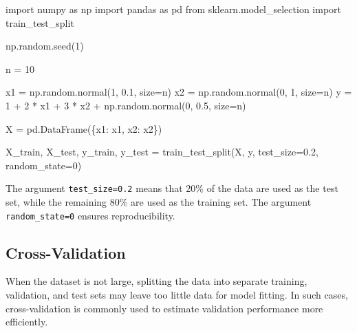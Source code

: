 \documentclass[
  letterpaper,
  DIV=11,
  numbers=noendperiod]{scrreprt}
\newenvironment{Shaded}{\begin{snugshade}}{\end{snugshade}}
\newcommand{\DecValTok}[1]{\textcolor[rgb]{0.68,0.00,0.00}{#1}}
\newcommand{\FloatTok}[1]{\textcolor[rgb]{0.68,0.00,0.00}{#1}}
\newcommand{\ImportTok}[1]{\textcolor[rgb]{0.00,0.46,0.62}{#1}}
\newcommand{\NormalTok}[1]{\textcolor[rgb]{0.00,0.23,0.31}{#1}}
\newcommand{\OperatorTok}[1]{\textcolor[rgb]{0.37,0.37,0.37}{#1}}
\newcommand{\StringTok}[1]{\textcolor[rgb]{0.13,0.47,0.30}{#1}}
\theoremstyle{definition}
\theoremstyle{definition}
\theoremstyle{plain}
\theoremstyle{plain}
\theoremstyle{remark}
\begin{document}
\begin{Shaded}
\begin{Highlighting}[]
\ImportTok{import}\NormalTok{ numpy }\ImportTok{as}\NormalTok{ np}
\ImportTok{import}\NormalTok{ pandas }\ImportTok{as}\NormalTok{ pd}
\ImportTok{from}\NormalTok{ sklearn.model\_selection }\ImportTok{import}\NormalTok{ train\_test\_split}

\NormalTok{np.random.seed(}\DecValTok{1}\NormalTok{)}

\NormalTok{n }\OperatorTok{=} \DecValTok{10}

\NormalTok{x1 }\OperatorTok{=}\NormalTok{ np.random.normal(}\DecValTok{1}\NormalTok{, }\FloatTok{0.1}\NormalTok{, size}\OperatorTok{=}\NormalTok{n)}
\NormalTok{x2 }\OperatorTok{=}\NormalTok{ np.random.normal(}\DecValTok{0}\NormalTok{, }\DecValTok{1}\NormalTok{, size}\OperatorTok{=}\NormalTok{n)}
\NormalTok{y }\OperatorTok{=} \DecValTok{1} \OperatorTok{+} \DecValTok{2} \OperatorTok{*}\NormalTok{ x1 }\OperatorTok{+} \DecValTok{3} \OperatorTok{*}\NormalTok{ x2 }\OperatorTok{+}\NormalTok{ np.random.normal(}\DecValTok{0}\NormalTok{, }\FloatTok{0.5}\NormalTok{, size}\OperatorTok{=}\NormalTok{n)}

\NormalTok{X }\OperatorTok{=}\NormalTok{ pd.DataFrame(\{}\StringTok{\textquotesingle{}x1\textquotesingle{}}\NormalTok{: x1, }\StringTok{\textquotesingle{}x2\textquotesingle{}}\NormalTok{: x2\})}

\NormalTok{X\_train, X\_test, y\_train, y\_test }\OperatorTok{=}\NormalTok{ train\_test\_split(X, y, test\_size}\OperatorTok{=}\FloatTok{0.2}\NormalTok{, random\_state}\OperatorTok{=}\DecValTok{0}\NormalTok{)}
\end{Highlighting}
\end{Shaded}

The argument \texttt{test\_size=0.2} means that 20\% of the data are
used as the test set, while the remaining 80\% are used as the training
set. The argument \texttt{random\_state=0} ensures reproducibility.

\subsection{Cross-Validation}\label{cross-validation}

When the dataset is not large, splitting the data into separate
training, validation, and test sets may leave too little data for model
fitting. In such cases, cross-validation is commonly used to estimate
validation performance more efficiently.
\end{document}
